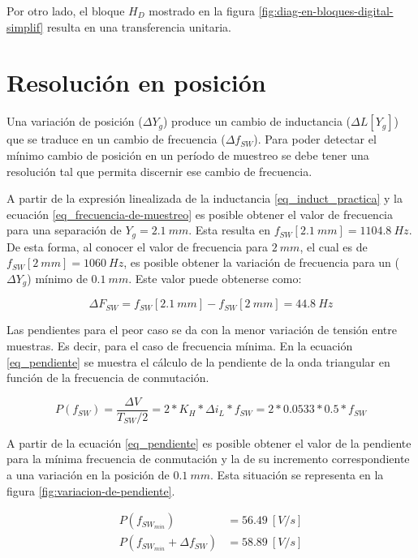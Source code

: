\noindent Por otro lado, el bloque $H_D$ mostrado en la figura \ref{fig:diag-en-bloques-digital-simplif} resulta en una transferencia unitaria.

\section{Resolución en posición}

\noindent Una variación de posición ($\Delta Y_g$) produce un cambio de inductancia ($\Delta L[Y_g]$) que se traduce en un cambio de frecuencia ($\Delta f_{SW}$). Para poder detectar el mínimo cambio de posición en un período de muestreo se debe tener una resolución tal que permita discernir ese cambio de frecuencia.


\noindent A partir de la expresión linealizada de la inductancia \ref{eq_induct_practica} y la ecuación \ref{eq_frecuencia-de-muestreo} es posible obtener el valor de frecuencia para una separación de $Y_g=2.1\:mm$. Esta resulta en $f_{SW}[2.1\:mm] = 1104.8\:Hz$. De esta forma, al conocer el valor de frecuencia para $2\:mm$, el cual es de $f_{SW}[2\:mm] = 1060\:Hz$, es posible obtener la variación de frecuencia para un ($\Delta Y_g$) mínimo de  $0.1\:mm$. Este valor puede obtenerse como:

\begin{equation} 
	\Delta F_{SW} = f_{SW}[2.1\:mm] - f_{SW}[2\:mm] = 44.8\:Hz
\end{equation}

\noindent Las pendientes para el peor caso se da con la menor variación de tensión entre muestras. Es decir, para el caso de frecuencia mínima. En la ecuación \ref{eq_pendiente} se muestra el cálculo de la pendiente de la onda triangular en función de la frecuencia de conmutación.

\begin{equation} \label{eq_pendiente}
	P(f_{SW}) = \frac{\Delta V}{T_{SW}/2} = 2*K_H*\Delta i_L*f_{SW} = 2 * 0.0533 * 0.5 * f_{SW}
\end{equation}

\noindent A partir de la ecuación \ref{eq_pendiente} es posible obtener el valor de la pendiente para la mínima frecuencia de conmutación y la de su incremento correspondiente a una variación en la posición de $0.1\:mm$. Esta situación se representa en la figura \ref{fig:variacion-de-pendiente}.

\begin{equation} 
	\begin{aligned}
		P(f_{SW_{min}}) &= 56.49\:[V/s] \\
		P(f_{SW_{min}} + \Delta f_{SW}) &= 58.89\:[V/s] \\
	\end{aligned}
\end{equation}

